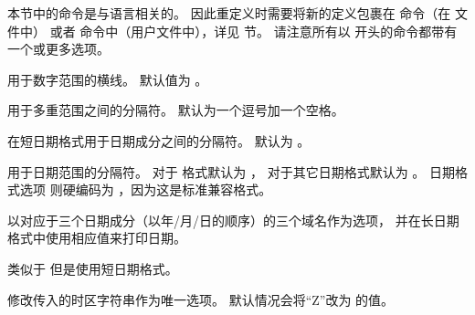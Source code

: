 本节中的命令是与语言相关的。
因此重定义时需要将新的定义包裹在  命令（在  文件中）
或者  命令中（用户文件中），详见  节。
请注意所有以  开头的命令都带有一个或更多选项。

\begin{ltxsyntax}


用于数字范围的横线。
默认值为 。


用于多重范围之间的分隔符。
默认为一个逗号加一个空格。


在短日期格式用于日期成分之间的分隔符。
默认为 。


用于日期范围的分隔符。
对于  格式默认为 ，
对于其它日期格式默认为 。
日期格式选项  则硬编码为 ，因为这是标准兼容格式。



以对应于三个日期成分（以年/月/日的顺序）的三个域名作为选项，
并在长日期格式中使用相应值来打印日期。


类似于  但是使用短日期格式。


修改传入的时区字符串作为唯一选项。
默认情况会将“Z”改为  的值。


\end{ltxsyntax}
